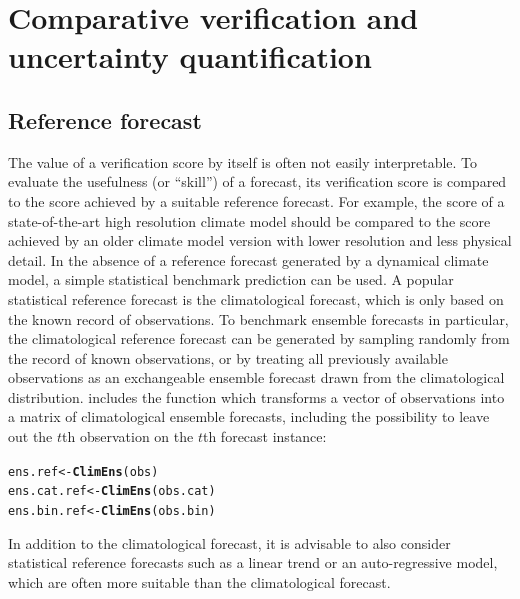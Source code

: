 \documentclass[article]{jss}\usepackage{graphicx, color}
\makeatletter
\newcommand{\hlfunctioncall}[1]{\textcolor[rgb]{0,0.501960784313725,0.752941176470588}{\textbf{#1}}}%
\newenvironment{kframe}{%
 \def\at@end@of@kframe{}%
 \ifinner\ifhmode%
  \def\at@end@of@kframe{\end{minipage}}%
  \begin{minipage}{\columnwidth}%
 \fi\fi%
 \def\FrameCommand##1{\hskip\@totalleftmargin \hskip-\fboxsep
 \colorbox{shadecolor}{##1}\hskip-\fboxsep
     \hskip-\linewidth \hskip-\@totalleftmargin \hskip\columnwidth}%
 \MakeFramed {\advance\hsize-\width
   \@totalleftmargin\z@ \linewidth\hsize
   \@setminipage}}%
 {\par\unskip\endMakeFramed%
 \at@end@of@kframe}
\newenvironment{knitrout}{}{} %
\makeatother
\begin{document}
\section{Comparative verification and uncertainty quantification}


\subsection{Reference forecast}

The value of a verification score by itself is often not easily interpretable.
To evaluate the usefulness (or ``skill'') of a forecast, its verification score is compared to the score achieved by a suitable reference forecast.
For example, the score of a state-of-the-art high resolution climate model should be compared to the score achieved by an older climate model version with lower resolution and less physical detail.
In the absence of a reference forecast generated by a dynamical climate model, a simple statistical benchmark prediction can be used.
A popular statistical reference forecast is the climatological forecast, which is only based on the known record of observations.
To benchmark ensemble forecasts in particular, the climatological reference forecast can be generated by sampling randomly from the record of known observations, or by treating all previously available observations as an exchangeable ensemble forecast drawn from the climatological distribution.
 includes the function  which transforms a vector of observations into a matrix of climatological ensemble forecasts, including the possibility to leave out the $t$th observation on the $t$th forecast instance:
%
\begin{knitrout}
\color{fgcolor}\begin{kframe}
\begin{alltt}
ens.ref     <- \hlfunctioncall{ClimEns}(obs)
ens.cat.ref <- \hlfunctioncall{ClimEns}(obs.cat)
ens.bin.ref <- \hlfunctioncall{ClimEns}(obs.bin)
\end{alltt}
\end{kframe}
\end{knitrout}

%
In addition to the climatological forecast, it is advisable to also consider statistical reference forecasts such as a linear trend or an auto-regressive model, which are often more suitable than the climatological forecast.
\end{document}
